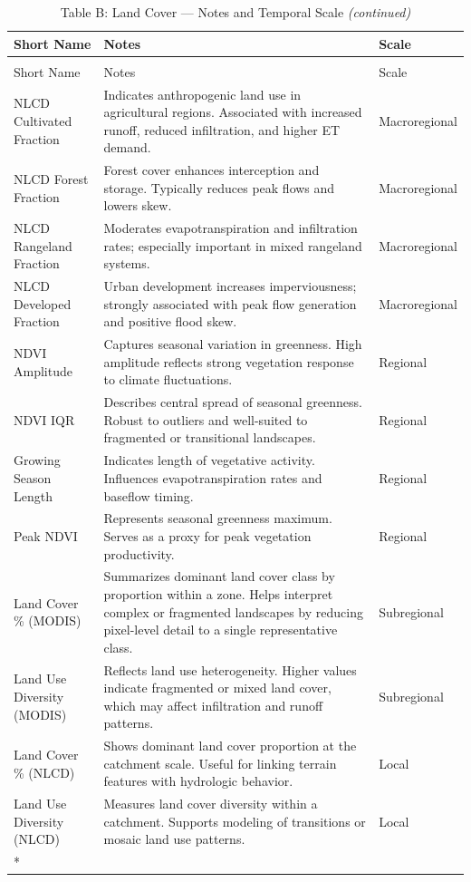 \documentclass[
  10pt,
]{article}
\begin{document}
\begingroup\fontsize{8}{10}\selectfont

\begin{longtable}[t]{lp{8cm}l}
\caption{\label{tab:create_tables}Table B: Land Cover — Notes and Temporal Scale}\\
\toprule
Short Name & Notes & Scale\\
\midrule
\endfirsthead
\caption[]{Table B: Land Cover — Notes and Temporal Scale \textit{(continued)}}\\
\toprule
Short Name & Notes & Scale\\
\midrule
\endhead

\endfoot
\bottomrule
\endlastfoot
NLCD Cultivated Fraction & Indicates anthropogenic land use in agricultural regions. Associated
with increased runoff, reduced infiltration, and higher ET demand. & Macroregional\\
NLCD Forest Fraction & Forest cover enhances interception and storage. Typically reduces peak
flows and lowers skew. & Macroregional\\
NLCD Rangeland Fraction & Moderates evapotranspiration and infiltration rates; especially
important in mixed rangeland systems. & Macroregional\\
NLCD Developed Fraction & Urban development increases imperviousness; strongly associated with
peak flow generation and positive flood skew. & Macroregional\\
NDVI Amplitude & Captures seasonal variation in greenness. High amplitude reflects
strong vegetation response to climate fluctuations. & Regional\\
\addlinespace
NDVI IQR & Describes central spread of seasonal greenness. Robust to outliers and
well-suited to fragmented or transitional landscapes. & Regional\\
Growing Season Length & Indicates length of vegetative activity. Influences evapotranspiration
rates and baseflow timing. & Regional\\
Peak NDVI & Represents seasonal greenness maximum. Serves as a proxy for peak
vegetation productivity. & Regional\\
Land Cover \% (MODIS) & Summarizes dominant land cover class by proportion within a zone.
Helps interpret complex or fragmented landscapes by reducing
pixel-level detail to a single representative class. & Subregional\\
Land Use Diversity (MODIS) & Reflects land use heterogeneity. Higher values indicate fragmented or
mixed land cover, which may affect infiltration and runoff patterns. & Subregional\\
\addlinespace
Land Cover \% (NLCD) & Shows dominant land cover proportion at the catchment scale. Useful
for linking terrain features with hydrologic behavior. & Local\\
Land Use Diversity (NLCD) & Measures land cover diversity within a catchment. Supports modeling of
transitions or mosaic land use patterns. & Local\\*
\end{longtable}
\endgroup{}

\clearpage
\end{document}
